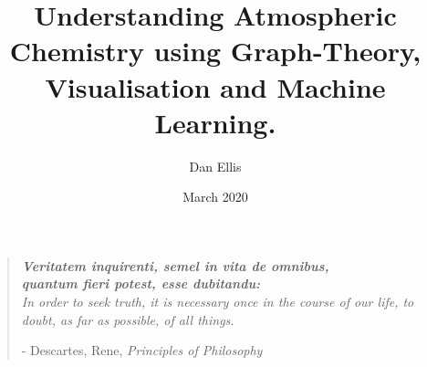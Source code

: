 \documentclass[twoside,openleft,reqno,a4paper,final]{book}
\title{Understanding Atmospheric Chemistry using Graph-Theory, Visualisation and Machine Learning. }
\author{Dan Ellis }
\date{March 2020}
\def\blankpage{%
      \clearpage%
      \thispagestyle{empty}%
      \addtocounter{page}{0}%
      \null%
      \clearpage}
\begin{document}

\frontmatter
\titleformat{\paragraph}[hang]{\normalfont\normalsize\bfseries}{\theparagraph}{1em}{}

\setcounter{secnumdepth}{3}
\setcounter{tocdepth}{3}

 \maketitle
\cleardoublepage{}
\setlength{\footnotesep}{0.5cm}
\raggedbottom %

\restoregeometry
\vspace*{0.15\paperheight}
\begin{center}
\begin{quotation}
    \centering
  \large{\emph{\textbf{Veritatem inquirenti, semel in vita de omnibus,\\ quantum fieri potest, esse dubitandu:}\\
 In order to seek truth, it is necessary once in the course of our life, to doubt, as far as possible, of all things. }  }  
\vspace{\baselineskip}\linebreak
  \begin{flushright}\small{
  - Descartes, Rene, \textit{Principles of Philosophy}
  }
\end{flushright}
 \end{quotation}
\end{center}



\tableofcontents
\newpage
\mainmatter



 \newpage



%
% 
%  
% 
% 
% 
% 
%  




\newpage
%
%
%
\end{document}
